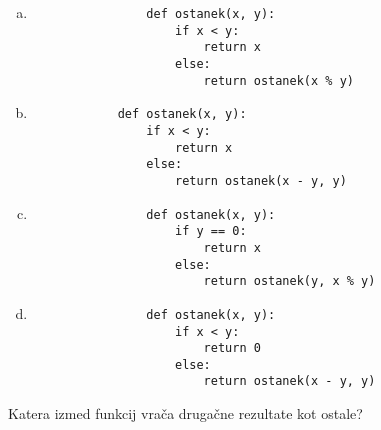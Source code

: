 \documentclass[arhiv, 10pt]{../izpit}
\begin{document}
        \begin{multicols}{2}
        \begin{enumerate}[(a)]
\item 
                \begin{verbatim}
                def ostanek(x, y):
                    if x < y:
                        return x
                    else:
                        return ostanek(x % y)
                \end{verbatim}
            
\item 
            \begin{verbatim}
            def ostanek(x, y):
                if x < y:
                    return x
                else:
                    return ostanek(x - y, y)
            \end{verbatim}
        
\item 
                \begin{verbatim}
                def ostanek(x, y):
                    if y == 0:
                        return x
                    else:
                        return ostanek(y, x % y)
                \end{verbatim}
            
\item 
                \begin{verbatim}
                def ostanek(x, y):
                    if x < y:
                        return 0
                    else:
                        return ostanek(x - y, y)
                \end{verbatim}
            
\end{enumerate}

        \end{multicols}
    
        \naloga*
        
        Katera izmed funkcij vrača drugačne rezultate kot ostale?
    
\end{document}

